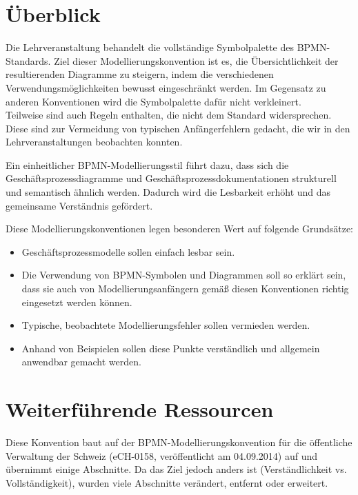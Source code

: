 \documentclass[12pt,report]{snetTeaching}
\begin{document}
\section{Überblick}

Die Lehrveranstaltung \lvname{} behandelt die vollständige Symbolpalette des BPMN-Standards. Ziel dieser Modellierungskonvention ist es, die Übersichtlichkeit der resultierenden Diagramme zu steigern, indem die verschiedenen Verwendungsmöglichkeiten bewusst eingeschränkt werden. Im Gegensatz zu anderen Konventionen wird die Symbolpalette dafür nicht verkleinert. \\
Teilweise sind auch Regeln enthalten, die nicht dem Standard widersprechen. Diese sind zur Vermeidung von typischen Anfängerfehlern gedacht, die wir in den Lehrveranstaltungen beobachten konnten.

Ein einheitlicher BPMN-Modellierungsstil führt dazu, dass sich die Geschäftsprozessdiagramme und Geschäftsprozessdokumentationen strukturell und semantisch ähnlich werden. Dadurch wird die Lesbarkeit erhöht und das gemeinsame Verständnis gefördert.

Diese Modellierungskonventionen legen besonderen Wert auf folgende Grundsätze:

\begin{itemize}
	\item Geschäftsprozessmodelle sollen einfach lesbar sein.
	
	\item Die Verwendung von BPMN-Symbolen und Diagrammen soll so erklärt sein, dass sie auch von Modellierungsanfängern gemäß diesen Konventionen richtig eingesetzt werden können.
	
	\item Typische, beobachtete Modellierungsfehler sollen vermieden werden.
	
	\item Anhand von Beispielen sollen diese Punkte verständlich und allgemein anwendbar gemacht werden.
\end{itemize}

\section{Weiterführende Ressourcen}

Diese Konvention baut auf der BPMN-Modellierungskonvention für die öffentliche Verwaltung der Schweiz (eCH-0158, veröffentlicht am 04.09.2014) auf und übernimmt einige Abschnitte. Da das Ziel jedoch anders ist (Verständlichkeit vs. Vollständigkeit), wurden viele Abschnitte verändert, entfernt oder erweitert.
\end{document}

